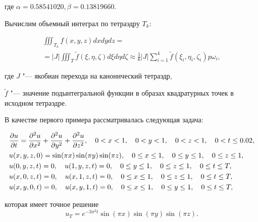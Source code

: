 где $\alpha=0.58541020,\beta=0.13819660$.

Вычислим объемный интеграл по тетраэдру $T_k$:

\begin{multline}

\iiint_{T_k}f\left(x,y,z\right)dxdydz= 

\\ =

|J|  \iiint_T\tilde{f}\left(\xi,\eta,\zeta\right)d\xi d\eta d\zeta 

\approx \frac{1}{6}|J|\sum^4_{i=1}\tilde{f} \left(\xi_i,\eta_i,\zeta_i\right)p\omega_i, 

\end{multline}

где $J$ "--- якобиан перехода на канонический тетраэдр, 

$\tilde{f}$ "---  значение подынтегральной функции в образах квадратурных точек в исходном тетраэдре.



\smallskip






В качестве первого примера рассматривалась следующая задача:

\begin{align}

&\frac{\partial u}{\partial t}=\frac{\partial^2 u}{\partial x^2} + \frac{\partial^2 u}{\partial y^2} + \frac{\partial^2 u}{\partial z^2}, \quad 0<x<1, \quad 0<y<1, \quad 0<z<1, \quad 0<t\le 0.02,\notag \\

&u(x,y,z, 0)=\sin(\pi x)\sin(\pi y)\sin(\pi z), \quad 0\le x \le 1, \quad 0\le y\le1, \quad 0\le z\le1, \notag \\

&u(0,y,z,t)=0,\quad u(1,y,z,t)=0, \quad 0\le y \le 1, \quad 0\le z \le 1, \quad 0\le t\le T, \notag \\

&u(x, 0,z,t)=0,\quad u(x, 1,z,t)=0, \quad 0\le x \le 1, \quad 0\le z \le 1, \quad 0\le t\le T, \notag \\

&u(x,y, 0,t)=0, \quad u(x,y, 1,t)=0, \quad 0\le x \le 1, \quad 0\le y \le 1, \quad 0\le t\le T, \notag

\end{align}

которая имеет точное решение  $$u_T=e^{-3\pi^2 t }\sin(\pi x)\sin(\pi y)\sin(\pi z).$$

